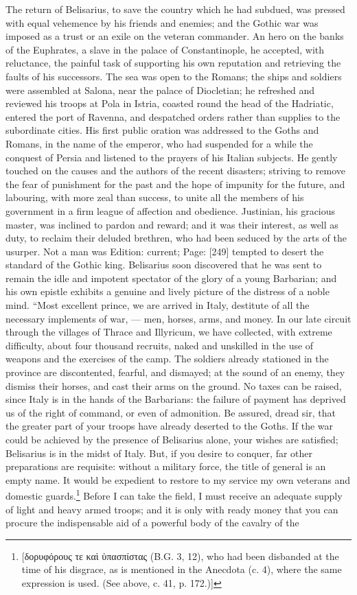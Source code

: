 The return of Belisarius, to save the country which he had subdued, was pressed with equal vehemence by his friends and enemies; and the Gothic war was imposed as a trust or an exile on the veteran commander. An hero on the banks of the Euphrates, a slave in the palace of Constantinople, he accepted, with reluctance, the painful task of supporting his own reputation and retrieving the faults of his successors. The sea was open to the Romans; the ships and soldiers were assembled at Salona, near the palace of Diocletian; he refreshed and reviewed his troops at Pola in Istria, coasted round the head of the Hadriatic, entered the port of Ravenna, and despatched orders rather than supplies to the subordinate cities. His first public oration was addressed to the Goths and Romans, in the name of the emperor, who had suspended for a while the conquest of Persia and listened to the prayers of his Italian subjects. He gently touched on the causes and the authors of the recent disasters; striving to remove the fear of punishment for the past and the hope of impunity for the future, and labouring, with more zeal than success, to unite all the members of his government in a firm league of affection and obedience. Justinian, his gracious master, was inclined to pardon and reward; and it was their interest, as well as duty, to reclaim their deluded brethren, who had been seduced by the arts of the usurper. Not a man was Edition: current; Page: [249] tempted to desert the standard of the Gothic king. Belisarius soon discovered that he was sent to remain the idle and impotent spectator of the glory of a young Barbarian; and his own epistle exhibits a genuine and lively picture of the distress of a noble mind. \texthebrew{“}Most excellent prince, we are arrived in Italy, destitute of all the necessary implements of war, \texthebrew{—} men, horses, arms, and money. In our late circuit through the villages of Thrace and Illyricum, we have collected, with extreme difficulty, about four thousand recruits, naked and unskilled in the use of weapons and the exercises of the camp. The soldiers already stationed in the province are discontented, fearful, and dismayed; at the sound of an enemy, they dismiss their horses, and cast their arms on the ground. No taxes can be raised, since Italy is in the hands of the Barbarians: the failure of payment has deprived us of the right of command, or even of admonition. Be assured, dread sir, that the greater part of your troops have already deserted to the Goths. If the war could be achieved by the presence of Belisarius alone, your wishes are satisfied; Belisarius is in the midst of Italy. But, if you desire to conquer, far other preparations are requisite: without a military force, the title of general is an empty name. It would be expedient to restore to my service my own veterans and domestic guards.\footnote{[\textgreek{δορυφόρους τε κα\texthebrew{ὶ ὑ}πασπίστας} (B.G. 3, 12), who had been disbanded at the time of his disgrace, as is mentioned in the Anecdota (c. 4), where the same expression is used. (See above, c. 41, p. 172.)]} Before I can take the field, I must receive an adequate supply of light and heavy armed troops; and it is only with ready money that you can procure the indispensable aid of a powerful body of the cavalry of the 